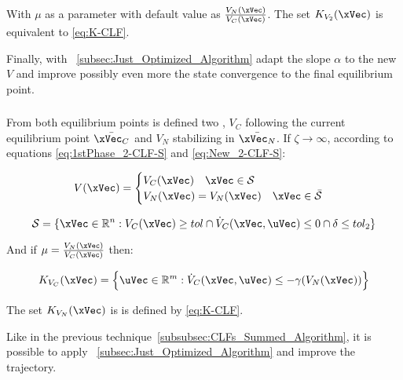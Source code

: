 With \(\mu\) as a parameter with default value as \( \frac{V_{N}(\xVec)}{V_{C}(\xVec)} \). The set \(K_{V_2}(\xVec)\) is equivalent to \ref{eq:K-CLF}. \par

Finally, with ~\ref{subsec:Just_Optimized_Algorithm} adapt the  slope \(\alpha\) to the new  \(V\) and improve possibly even more the state convergence to the final equilibrium point.\\





\subsubsection{}
\label{subsubsec:CLFs_Independent_Algorithm}

From both equilibrium points is defined two , \(V_C\) following the current equilibrium point \(\bar{\xVec_C}\) and \(V_N\) stabilizing in \(\bar{\xVec_N}\). If \(\zeta \to \infty\), according to equations \ref{eq:1stPhase_2-CLF-S} and \ref{eq:New_2-CLF-S}:


\begin{align}
    V(\xVec) = 
    \begin{cases}
        V_C(\xVec) \quad \xVec \in \mathcal{S}\\
        V_N(\xVec) = V_{N}(\xVec) \quad \xVec \in \bar{\mathcal{S}}
    \end{cases}
    \label{eq:New_2-CLF-I}
\end{align}


\begin{equation}
    \mathcal{S} = \{\xVec \in \mathbb{R}^n: V_{C}(\xVec) \geq tol \cap \dot{V}_{C}(\xVec, \uVec) \leq 0 \cap \delta \leq tol_2\}
    \label{eq:New_2-CLF-I_actuationPhaseSet}
\end{equation}



And if \(\mu = \frac{V_{N}(\xVec)}{V_{C}(\xVec)}\) then:

\begin{align}
    K_{V_C}(\xVec) = \Bigl\{\uVec \in \mathbb{R}^m:  \dot{V}_{C}(\xVec, \uVec) \leq -\gamma( V_{N}(\xVec)  )\Bigr\}
    \label{eq:2-CLF-I_Constraint}
\end{align}

The set \(K_{V_N}(\xVec)\) is is defined by \ref{eq:K-CLF}. \par
Like in the previous technique~\ref{subsubsec:CLFs_Summed_Algorithm}, it is possible to apply ~\ref{subsec:Just_Optimized_Algorithm} and improve the trajectory.\\


